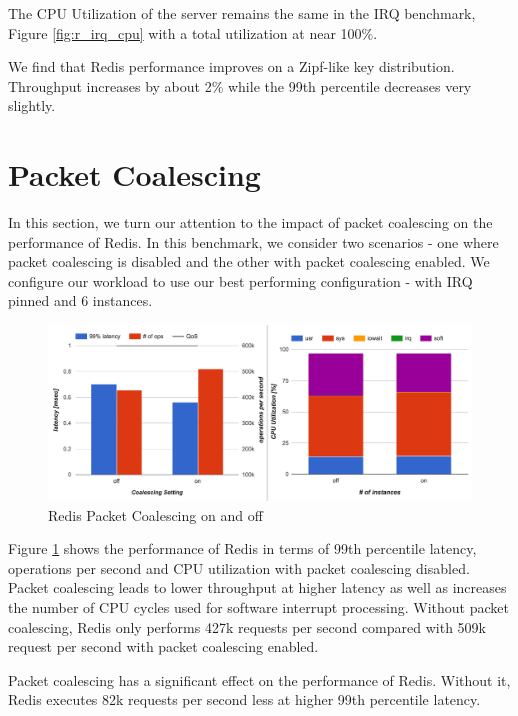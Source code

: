 The CPU Utilization of the server remains the same in the IRQ benchmark, Figure \ref{fig:r_irq_cpu} with a total utilization at near 100\%.

We find that Redis performance improves on a Zipf-like key distribution. Throughput increases by about 2\% while the 99th percentile decreases very slightly.


\section{Packet Coalescing}
In this section, we turn our attention to the impact of packet coalescing on the performance of Redis. In this benchmark, we consider two scenarios - one where packet coalescing is disabled and the other with packet coalescing enabled. We configure our workload to use our best performing configuration - with IRQ pinned and 6 instances.

\begin{figure}[h]
    \includegraphics[width=\textwidth]{./res2/r_coalesce.png}
    \caption{Redis Packet Coalescing on and off}
    \label{fig:r_coalesce}
\end{figure}

Figure \ref{fig:r_coalesce} shows the performance of Redis in terms of 99th percentile latency, operations per second and CPU utilization with packet coalescing disabled. Packet coalescing leads to lower throughput at higher latency as well as increases the number of CPU cycles used for software interrupt processing. Without packet coalescing, Redis only performs 427k requests per second compared with 509k request per second with packet coalescing enabled.

Packet coalescing has a significant effect on the performance of Redis. Without it, Redis executes 82k requests per second less at higher 99th percentile latency.